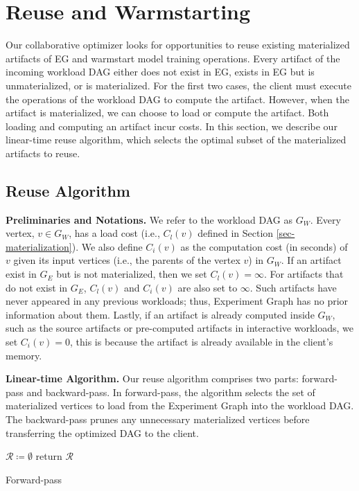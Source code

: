 \section{Reuse and Warmstarting}\label{sec-reuse-and-warmstarting}
Our collaborative optimizer looks for opportunities to reuse existing materialized artifacts of EG and warmstart model training operations.
Every artifact of the incoming workload DAG either does not exist in EG, exists in EG but is unmaterialized, or is materialized.
For the first two cases, the client must execute the operations of the workload DAG to compute the artifact.
However, when the artifact is materialized, we can choose to load or compute the artifact.
Both loading and computing an artifact incur costs.
In this section, we describe our linear-time reuse algorithm, which selects the optimal subset of the materialized artifacts to reuse.

\subsection{Reuse Algorithm} 
\textbf{Preliminaries and Notations.} 
We refer to the workload DAG as $G_W$.
Every vertex, $v \in G_W$, has a load cost (i.e., $C_l(v)$ defined in Section \ref{sec-materialization}).
We also define $C_i(v)$ as the computation cost (in seconds) of $v$ given its input vertices (i.e., the parents of the vertex $v$) in $G_W$.
If an artifact exist in $G_E$ but is not materialized, then we set $C_l(v)=\infty$.
For artifacts that do not exist in $G_E$, $C_l(v)$ and $C_i(v)$ are also set to $\infty$.
Such artifacts have never appeared in any previous workloads; thus, Experiment Graph has no prior information about them.
Lastly, if an artifact is already computed inside $G_W$, such as the source artifacts or pre-computed artifacts in interactive workloads, we set $C_i(v)=0$, this is because the artifact is already available in the client's memory.

\textbf{Linear-time Algorithm.}
Our reuse algorithm comprises two parts: forward-pass and backward-pass.
In forward-pass, the algorithm selects the set of materialized vertices to load from the Experiment Graph into the workload DAG.
The backward-pass prunes any unnecessary materialized vertices before transferring the optimized DAG to the client.
\begin{algorithm}[ht]
$\mathcal{R} \coloneqq \emptyset$\;
return $\mathcal{R}$\;
\caption{Forward-pass}\label{forward-pass}
\end{algorithm}

